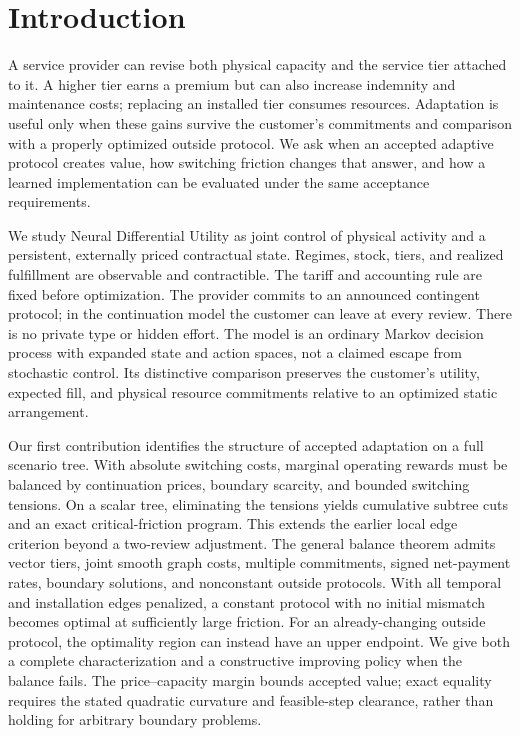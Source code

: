 \documentclass[11pt,letterpaper]{article}
\theoremstyle{definition}
\newcommand{\1}{\mathbf 1}
\begin{document}
\section{Introduction}
A service provider can revise both physical capacity and the service tier attached to it. A higher tier earns a premium but can also increase indemnity and maintenance costs; replacing an installed tier consumes resources. Adaptation is useful only when these gains survive the customer's commitments and comparison with a properly optimized outside protocol. We ask when an accepted adaptive protocol creates value, how switching friction changes that answer, and how a learned implementation can be evaluated under the same acceptance requirements.

We study Neural Differential Utility as joint control of physical activity and a persistent, externally priced contractual state. Regimes, stock, tiers, and realized fulfillment are observable and contractible. The tariff and accounting rule are fixed before optimization. The provider commits to an announced contingent protocol; in the continuation model the customer can leave at every review. There is no private type or hidden effort. The model is an ordinary Markov decision process with expanded state and action spaces, not a claimed escape from stochastic control. Its distinctive comparison preserves the customer's utility, expected fill, and physical resource commitments relative to an optimized static arrangement.

Our first contribution identifies the structure of accepted adaptation on a full scenario tree. With absolute switching costs, marginal operating rewards must be balanced by continuation prices, boundary scarcity, and bounded switching tensions. On a scalar tree, eliminating the tensions yields cumulative subtree cuts and an exact critical-friction program. This extends the earlier local edge criterion beyond a two-review adjustment. The general balance theorem admits vector tiers, joint smooth graph costs, multiple commitments, signed net-payment rates, boundary solutions, and nonconstant outside protocols. With all temporal and installation edges penalized, a constant protocol with no initial mismatch becomes optimal at sufficiently large friction. For an already-changing outside protocol, the optimality region can instead have an upper endpoint. We give both a complete characterization and a constructive improving policy when the balance fails. The price--capacity margin bounds accepted value; exact equality requires the stated quadratic curvature and feasible-step clearance, rather than holding for arbitrary boundary problems.
\end{document}
